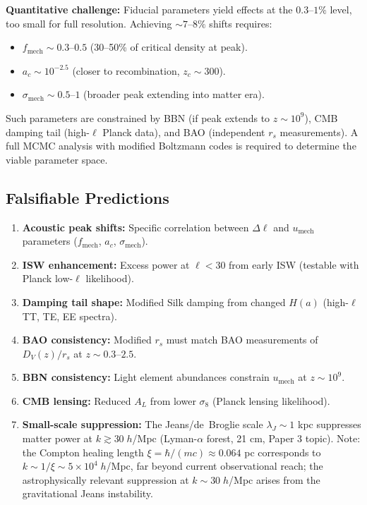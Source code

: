 \documentclass[11pt,a4paper]{article}
\newcommand{\umech}{\ensuremath{u_{\mathrm{mech}}}}
\newcommand{\fmech}{\ensuremath{f_{\mathrm{mech}}}}
\newcommand{\ac}{\ensuremath{a_c}}
\newcommand{\sigmamech}{\ensuremath{\sigma_{\mathrm{mech}}}}
\newcommand{\rs}{\ensuremath{r_s}}
\theoremstyle{definition}
\theoremstyle{remark}
\begin{document}
\textbf{Quantitative challenge:} Fiducial parameters yield effects at the $0.3$--$1\%$ level, too small for full resolution. Achieving $\sim 7$--$8\%$ shifts requires:
\begin{itemize}[leftmargin=*, itemsep=0.2em]
\item $\fmech \sim 0.3$--$0.5$ (30--50\% of critical density at peak).
\item $\ac \sim 10^{-2.5}$ (closer to recombination, $z_c \sim 300$).
\item $\sigmamech \sim 0.5$--$1$ (broader peak extending into matter era).
\end{itemize}

Such parameters are constrained by BBN (if peak extends to $z \sim 10^9$), CMB damping tail (high-$\ell$ Planck data), and BAO (independent $\rs$ measurements). A full MCMC analysis with modified Boltzmann codes is required to determine the viable parameter space.

\subsection{Falsifiable Predictions}
\label{sec:falsifiable}

\begin{enumerate}[leftmargin=*, itemsep=0.3em]
\item \textbf{Acoustic peak shifts:} Specific correlation between $\Delta\ell$ and $\umech$ parameters ($\fmech$, $\ac$, $\sigmamech$).

\item \textbf{ISW enhancement:} Excess power at $\ell < 30$ from early ISW (testable with Planck low-$\ell$ likelihood).

\item \textbf{Damping tail shape:} Modified Silk damping from changed $H(a)$ (high-$\ell$ TT, TE, EE spectra).

\item \textbf{BAO consistency:} Modified $\rs$ must match BAO measurements of $D_V(z)/\rs$ at $z \sim 0.3$--$2.5$.

\item \textbf{BBN consistency:} Light element abundances constrain $\umech$ at $z \sim 10^9$.

\item \textbf{CMB lensing:} Reduced $A_L$ from lower $\sigma_8$ (Planck lensing likelihood).

\item \textbf{Small-scale suppression:} The Jeans/de~Broglie scale $\lambda_J \sim 1$ kpc suppresses matter power at $k \gtrsim 30\; h$/Mpc (Lyman-$\alpha$ forest, 21 cm, Paper 3 topic). Note: the Compton healing length $\xi = \hbar/(mc) \approx 0.064$ pc corresponds to $k \sim 1/\xi \sim 5 \times 10^4\; h$/Mpc, far beyond current observational reach; the astrophysically relevant suppression at $k \sim 30\; h$/Mpc arises from the gravitational Jeans instability.
\end{enumerate}
\end{document}
